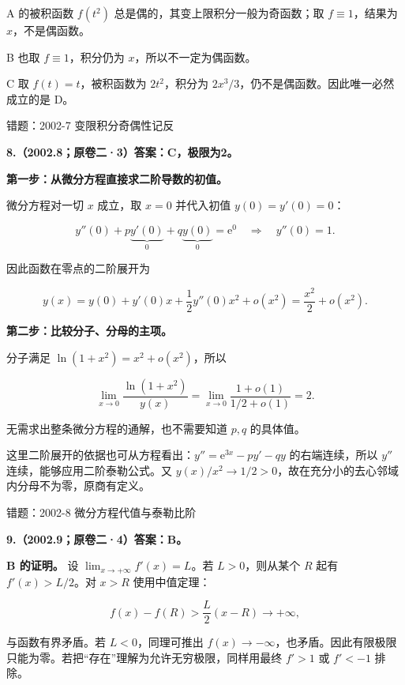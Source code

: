 \documentclass[UTF8,11pt,fontset=windows]{ctexart}
\begin{document}
A 的被积函数 $f(t^2)$ 总是偶的，其变上限积分一般为奇函数；取 $f\equiv1$，结果为 $x$，不是偶函数。

B 也取 $f\equiv1$，积分仍为 $x$，所以不一定为偶函数。

C 取 $f(t)=t$，被积函数为 $2t^2$，积分为 $2x^3/3$，仍不是偶函数。因此唯一必然成立的是 D。

\begingroup\color{gray}错题：2002-7 变限积分奇偶性记反\par\endgroup

\clearpage

\textbf{8.（2002.8；原卷二·3）答案：C，极限为2。}

\textbf{第一步：从微分方程直接求二阶导数的初值。}

微分方程对一切 $x$ 成立，取 $x=0$ 并代入初值 $y(0)=y'(0)=0$：

$$
y''(0)+p\underbrace{y'(0)}_{0}+q\underbrace{y(0)}_{0}=\mathrm e^{0}
\quad\Longrightarrow\quad
y''(0)=1.
$$

因此函数在零点的二阶展开为

$$
y(x)=y(0)+y'(0)x+\frac12y''(0)x^2+o(x^2)
=\frac{x^2}{2}+o(x^2).
$$

\textbf{第二步：比较分子、分母的主项。}

分子满足 $\ln(1+x^2)=x^2+o(x^2)$，所以

$$
\lim_{x\to0}\frac{\ln(1+x^2)}{y(x)}
=\lim_{x\to0}\frac{1+o(1)}{1/2+o(1)}=2.
$$

无需求出整条微分方程的通解，也不需要知道 $p,q$ 的具体值。

这里二阶展开的依据也可从方程看出：$y''=\mathrm e^{3x}-py'-qy$ 的右端连续，所以 $y''$ 连续，能够应用二阶泰勒公式。又 $y(x)/x^2\to1/2>0$，故在充分小的去心邻域内分母不为零，原商有定义。

\begingroup\color{gray}错题：2002-8 微分方程代值与泰勒比阶\par\endgroup

\clearpage

\textbf{9.（2002.9；原卷二·4）答案：B。}

\textbf{B 的证明。} 设 $\lim_{x\to+\infty}f'(x)=L$。若 $L>0$，则从某个 $R$ 起有 $f'(x)>L/2$。对 $x>R$ 使用中值定理：

$$
f(x)-f(R)>\frac L2(x-R)\longrightarrow+\infty,
$$

与函数有界矛盾。若 $L<0$，同理可推出 $f(x)\to-\infty$，也矛盾。因此有限极限只能为零。若把“存在”理解为允许无穷极限，同样用最终 $f'>1$ 或 $f'<-1$ 排除。
\end{document}

